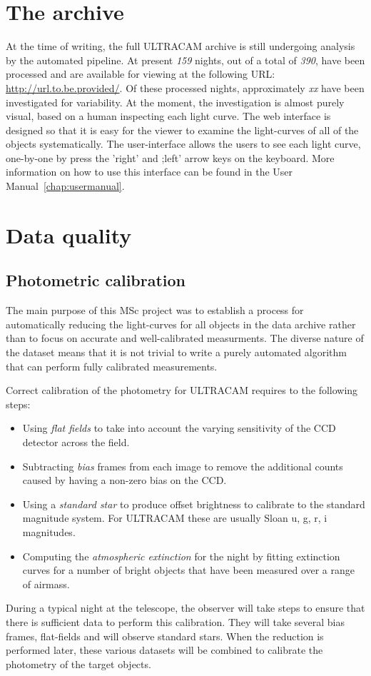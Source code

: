 \section{The archive} 

At the time of writing, the full ULTRACAM archive is still undergoing analysis by the automated pipeline. At present \emph{159} nights, out of a total of \emph{390}, have been processed and are available for viewing at the following URL: \url{http://url.to.be.provided/}. Of these processed nights, approximately \emph{xx} have been investigated for variability. At the moment, the investigation is almost purely visual, based on a human inspecting each light curve. The web interface is designed so that it is easy for the viewer to examine the light-curves of all of the objects systematically. The user-interface allows the users to see each light curve, one-by-one by press the 'right' and ;left'  arrow keys on the keyboard. More information on how to use this interface can be found in the User Manual~\ref{chap:usermanual}. 

\section{Data quality}

\subsection{Photometric calibration}
The main purpose of this MSc project was to establish a process for automatically reducing the light-curves for all objects in the data archive rather than to focus on accurate and well-calibrated measurments. The diverse nature of the dataset means that it is not trivial to write a purely automated algorithm that can perform fully calibrated measurements. 

Correct calibration of the photometry for ULTRACAM requires to the following steps:
\begin{itemize}
  \item Using \emph{flat fields} to take into account the varying sensitivity of the CCD detector across the field. 
  \item Subtracting \emph{bias} frames from each image to remove the additional counts caused by having a non-zero bias on the CCD. 
  \item Using a \emph{standard star} to produce offset brightness to calibrate to the standard magnitude system. For ULTRACAM these are usually Sloan u, g, r, i magnitudes.
  \item Computing the \emph{atmospheric extinction} for the night by fitting extinction curves for a number of bright objects that have been measured over a range of airmass. 
\end{itemize}
During a typical night at the telescope, the observer will take steps to ensure that there is sufficient data to perform this calibration. They will take several bias frames, flat-fields and will observe standard stars. When the reduction is performed later, these various datasets will be combined to calibrate the photometry of the target objects. 

